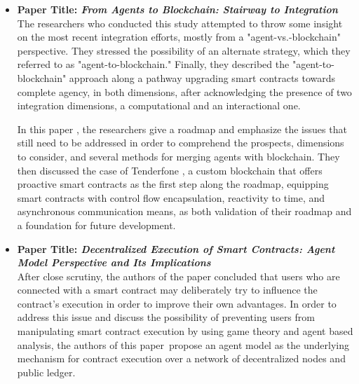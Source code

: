 \begin{itemize}[label={}]

\item \textbf{Paper Title: \textit{From Agents to Blockchain: Stairway to Integration}} \\

The researchers who conducted this study attempted to throw some insight on the most recent integration efforts, mostly from a "agent-vs.-blockchain" perspective. They stressed the possibility of an alternate strategy, which they referred to as "agent-to-blockchain." Finally, they described the "agent-to-blockchain" approach along a pathway upgrading smart contracts towards complete agency, in both dimensions, after acknowledging the presence of two integration dimensions, a computational and an interactional one.

\vspace{.5cm}

In this paper \cite{ag2bc}, the researchers give a roadmap and emphasize the issues that still need to be addressed in order to comprehend the prospects, dimensions to consider, and several methods for merging agents with blockchain. They then discussed the case of Tenderfone \cite{tenGlab}, a custom blockchain that offers proactive smart contracts as the first step along the roadmap, equipping smart contracts with control flow encapsulation, reactivity to time, and asynchronous communication means, as both validation of their roadmap and a foundation for future development.

\vspace{.5cm}

\item \textbf{Paper Title: \textit{Decentralized Execution of Smart Contracts: Agent Model Perspective and Its Implications}}\\

After close scrutiny, the authors of the paper \cite{decentralized} concluded that users who are connected with a smart contract may deliberately try to influence the contract's execution in order to improve their own advantages. In order to address this issue and discuss the possibility of preventing users from manipulating smart contract execution by using game theory and agent based analysis, the authors of this paper propose an agent model as the underlying mechanism for contract execution over a network of decentralized nodes and public ledger.

\vspace{.5cm}


\end{itemize}
